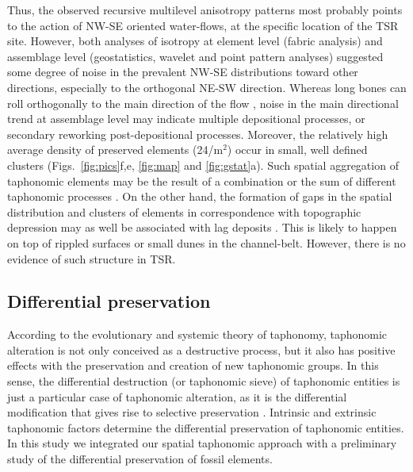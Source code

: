 \documentclass[review,times,authoryear]{elsarticle} %
\begin{document}
Thus, the observed recursive multilevel anisotropy patterns most probably points to the action of NW-SE oriented water-flows, at the specific location of the TSR site. However, both analyses of isotropy at element level (fabric analysis) and assemblage level (geostatistics, wavelet and point pattern analyses) suggested some degree of noise in the prevalent NW-SE distributions toward other directions, especially to the orthogonal NE-SW direction. Whereas long bones can roll orthogonally to the main direction of the flow \citep{Voorhies1969}, noise in the main directional trend at assemblage level may indicate multiple depositional processes, or secondary reworking post-depositional processes. Moreover, the relatively high average density of preserved elements (24/m$^2$) occur in small, well defined clusters (Figs.~\ref{fig:pics}f,e, \ref{fig:map} and \ref{fig:gstat}a). Such spatial aggregation of taphonomic elements may be the result of a combination or the sum of different taphonomic processes \citep{Fernandez-Lopez2002}. On the other hand, the formation of gaps in the spatial distribution and clusters of elements in correspondence with topographic depression may as well be associated with lag deposits \citep{Petraglia1994}. This is likely to happen on top of rippled surfaces or small dunes in the channel-belt. However, there is no evidence of such structure in TSR.

\subsection{Differential preservation}

According to the evolutionary and systemic theory of taphonomy, taphonomic alteration is not only conceived as a destructive process, but it also has positive effects with the preservation and creation of new taphonomic groups. In this sense, the differential destruction (or taphonomic sieve) of taphonomic entities is just a particular case of taphonomic alteration, as it is the differential modification that gives rise to selective preservation \citep{Fernandez-Lopez2006}. Intrinsic and extrinsic taphonomic factors determine the differential preservation of taphonomic entities. In this study we integrated our spatial taphonomic approach with a preliminary study of the differential preservation of fossil elements.
\end{document}
